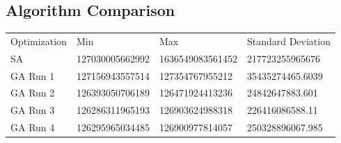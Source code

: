 \subsection{Algorithm Comparison}
\begin{tabular}{llll}
Optimization	& Min			& Max			& Standard Deviation \\
SA		& 127030005662992 	& 1636549083561452	& 217723255965676 \\
GA Run 1	& 127156943557514	& 127354767955212	& 35435274465.6039 \\
GA Run 2	& 126393050706189	& 126471924413236	& 24842647883.601 \\
GA Run 3	& 126286311965193	& 126903624988318	& 226416086588.11 \\
GA Run 4	& 126295965034485	& 126900977814057	& 250328896067.985 \\
\end{tabular}

